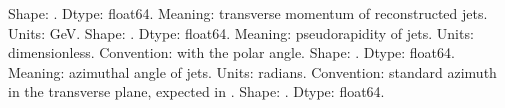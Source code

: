 \markdownRendererUlEndTight \markdownRendererUlItemEnd 
\markdownRendererUlEndTight \markdownRendererInterblockSeparator
{}\markdownRendererSectionBegin
{}\markdownRendererInterblockSeparator
{}\markdownRendererUlBeginTight
\markdownRendererUlItem Shape: .\markdownRendererUlItemEnd 
\markdownRendererUlItem Dtype: float64.\markdownRendererUlItemEnd 
\markdownRendererUlItem Meaning: transverse momentum of reconstructed jets.\markdownRendererUlItemEnd 
\markdownRendererUlItem Units: GeV.\markdownRendererUlItemEnd 
\markdownRendererUlEndTight \markdownRendererInterblockSeparator
{}
\markdownRendererSectionEnd \markdownRendererSectionBegin
{}\markdownRendererInterblockSeparator
{}\markdownRendererUlBeginTight
\markdownRendererUlItem Shape: .\markdownRendererUlItemEnd 
\markdownRendererUlItem Dtype: float64.\markdownRendererUlItemEnd 
\markdownRendererUlItem Meaning: pseudorapidity of jets.\markdownRendererUlItemEnd 
\markdownRendererUlItem Units: dimensionless.\markdownRendererUlItemEnd 
\markdownRendererUlItem Convention:  with \markdownRendererInlineMath{\theta} the polar angle.\markdownRendererUlItemEnd 
\markdownRendererUlEndTight \markdownRendererInterblockSeparator
{}
\markdownRendererSectionEnd \markdownRendererSectionBegin
{}\markdownRendererInterblockSeparator
{}\markdownRendererUlBeginTight
\markdownRendererUlItem Shape: .\markdownRendererUlItemEnd 
\markdownRendererUlItem Dtype: float64.\markdownRendererUlItemEnd 
\markdownRendererUlItem Meaning: azimuthal angle of jets.\markdownRendererUlItemEnd 
\markdownRendererUlItem Units: radians.\markdownRendererUlItemEnd 
\markdownRendererUlItem Convention: standard azimuth in the transverse plane, expected in \markdownRendererInlineMath{[-\pi, \pi)}.\markdownRendererUlItemEnd 
\markdownRendererUlEndTight \markdownRendererInterblockSeparator
{}
\markdownRendererSectionEnd \markdownRendererSectionBegin
{}\markdownRendererInterblockSeparator
{}\markdownRendererUlBeginTight
\markdownRendererUlItem Shape: .\markdownRendererUlItemEnd 
\markdownRendererUlItem Dtype: float64.\markdownRendererUlItemEnd 
